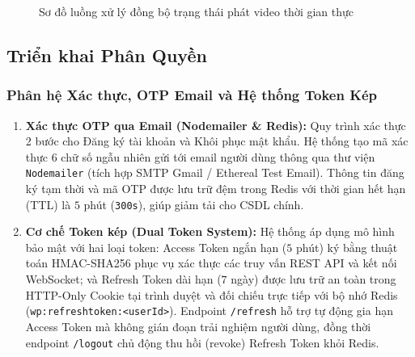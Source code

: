 \documentclass[12pt,a4paper]{extarticle}
\begin{document}
\begin{figure}[H]
{%
}
\caption{Sơ đồ luồng xử lý đồng bộ trạng thái phát video thời gian thực}
\label{fig:sync_sequence_flow}
\end{figure}


\subsection{Triển khai Phân Quyền}

\subsubsection{Phân hệ Xác thực, OTP Email và Hệ thống Token Kép}
\begin{enumerate}[leftmargin=1.2cm]
    \item \textbf{Xác thực OTP qua Email (Nodemailer \& Redis):} Quy trình xác thực 2 bước cho Đăng ký tài khoản và Khôi phục mật khẩu. Hệ thống tạo mã xác thực 6 chữ số ngẫu nhiên gửi tới email người dùng thông qua thư viện \texttt{Nodemailer} (tích hợp SMTP Gmail / Ethereal Test Email). Thông tin đăng ký tạm thời và mã OTP được lưu trữ đệm trong Redis với thời gian hết hạn (TTL) là $5$ phút (\texttt{300s}), giúp giảm tải cho CSDL chính.
    \item \textbf{Cơ chế Token kép (Dual Token System):} Hệ thống áp dụng mô hình bảo mật với hai loại token: Access Token ngắn hạn ($5$ phút) ký bằng thuật toán HMAC-SHA256 phục vụ xác thực các truy vấn REST API và kết nối WebSocket; và Refresh Token dài hạn ($7$ ngày) được lưu trữ an toàn trong HTTP-Only Cookie tại trình duyệt và đối chiếu trực tiếp với bộ nhớ Redis (\texttt{wp:refreshtoken:<userId>}). Endpoint \texttt{/refresh} hỗ trợ tự động gia hạn Access Token mà không gián đoạn trải nghiệm người dùng, đồng thời endpoint \texttt{/logout} chủ động thu hồi (revoke) Refresh Token khỏi Redis.
\end{enumerate}
\end{document}
